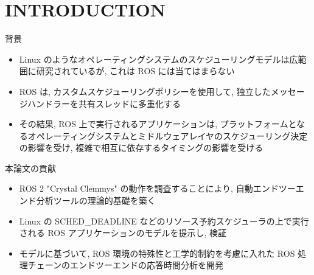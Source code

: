 
\section{INTRODUCTION}
\label{sec: introduction}

\begin{frame}{背景}
    \begin{itemize}
        \item Linux のようなオペレーティングシステムのスケジューリングモデルは広範囲に研究されているが, これは ROS には当てはまらない
        \item ROS は, カスタムスケジューリングポリシーを使用して, 独立したメッセージハンドラーを共有スレッドに多重化する
        \item その結果, ROS 上で実行されるアプリケーションは, プラットフォームとなるオペレーティングシステムとミドルウェアレイヤのスケジューリング決定の影響を受け, 複雑で相互に依存するタイミングの影響を受ける
    \end{itemize}
\end{frame}

\begin{frame}{本論文の貢献}
    \begin{itemize}
        \item ROS 2 "Crystal Clemmys" の動作を調査することにより, 自動エンドツーエンド分析ツールの理論的基礎を築く
        \item Linux の SCHED\_DEADLINE などのリソース予約スケジューラの上で実行される ROS アプリケーションのモデルを提示し, 検証
        \item モデルに基づいて, ROS 環境の特殊性と工学的制約を考慮に入れた ROS 処理チェーンのエンドツーエンドの応答時間分析を開発
    \end{itemize}
\end{frame}

